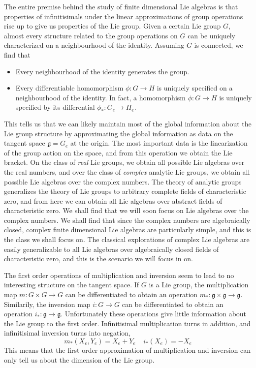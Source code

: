 The entire premise behind the study of finite dimensional Lie algebras is that properties of infinitisimals under the linear approximations of group operations rise up to give us properties of the Lie group. Given a certain Lie group $G$, almost every structure related to the group operations on $G$ can be uniquely characterized on a neighbourhood of the identity. Assuming $G$ is connected, we find that
%
\begin{itemize}
    \item Every neighbourhood of the identity generates the group.
    \item Every differentiable homomorphism $\phi: G \to H$ is uniquely specified on a neighbourhood of the identity. In fact, a homomorphism $\phi: G \to H$ is uniquely specified by its differential $\phi_*: G_e \to H_e$.
\end{itemize}
%
This tells us that we can likely maintain most of the global information about the Lie group structure by approximating the global information as data on the tangent space $\mathfrak{g} = G_e$ at the origin. The most important data is the linearization of the group action on the space, and from this operation we obtain the Lie bracket. On the class of {\it real} Lie groups, we obtain all possible Lie algebras over the real numbers, and over the class of {\it complex} analytic Lie groups, we obtain all possible Lie algebras over the complex numbers. The theory of analytic groups generalizes the theory of Lie groups to arbitrary complete fields of characteristic zero, and from here we can obtain all Lie algebras over abstract fields of characteristic zero. We shall find that we will soon focus on Lie algebras over the complex numbers. We shall find that since the complex numbers are algebraically closed, complex finite dimensional Lie algebras are particularly simple, and this is the class we shall focus on. The classical explorations of complex Lie algebras are easily generalizable to all Lie algebras over algebraically closed fields of characteristic zero, and this is the scenario we will focus in on.

The first order operations of multiplication and inversion seem to lead to no interesting structure on the tangent space. If $G$ is a Lie group, the multiplication map $m: G \times G \to G$ can be differentiated to obtain an operation $m_*: \mathfrak{g} \times \mathfrak{g} \to \mathfrak{g}$. Similarily, the inversion map $i: G \to G$ can be differentiated to obtain an operation $i_*: \mathfrak{g} \to \mathfrak{g}$. Unfortunately these operations give little information about the Lie group to the first order. Infinitisimal multiplication turns in addition, and infinitisimal inversion turns into negation,
%
\[ m_*(X_e, Y_e) = X_e + Y_e\ \ \ \ \ i_*(X_e) = -X_e \]
%
This means that the first order approximation of multiplication and inversion can only tell us about the dimension of the Lie group.

